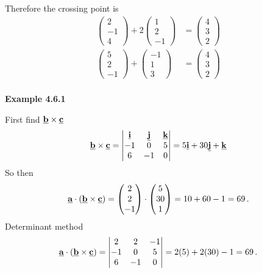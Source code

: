 Therefore the crossing point is
\begin{align*}
\begin{pmatrix} 2 \\ -1 \\ 4 \end{pmatrix} + 2 \begin{pmatrix} 1 \\ 2 \\ -1 \end{pmatrix} &= \begin{pmatrix} 4 \\ 3 \\ 2 \end{pmatrix}\\
\begin{pmatrix} 5 \\ 2 \\ -1 \end{pmatrix} + \begin{pmatrix} -1 \\ 1 \\ 3 \end{pmatrix} &= \begin{pmatrix} 4 \\ 3 \\ 2 \end{pmatrix}\\
\end{align*}

\textbf{Example 4.6.1} \par

First find $\underline{\mathbf{b}}\times\underline{\mathbf{c}}$
\begin{align*}
\underline{\mathbf{b}}\times\underline{\mathbf{c}} = \begin{vmatrix}
    \underline{\mathbf{i}} & \underline{\mathbf{j}} & \underline{\mathbf{k}}\\
    -1 & 0 & 5 \\
    6 & -1 & 0
\end{vmatrix} = 5\underline{\mathbf{i}} + 30\underline{\mathbf{j}} + \underline{\mathbf{k}}\\
\end{align*}
So then
\begin{align*}
\underline{\mathbf{a}} \cdot (\underline{\mathbf{b}}\times\underline{\mathbf{c}}) = \begin{pmatrix}
    2 \\ 2 \\ -1
\end{pmatrix}
\cdot
\begin{pmatrix}
    5 \\ 30 \\ 1
\end{pmatrix} = 10 + 60 - 1 = 69 \,.
\end{align*}
Determinant method
\begin{align*}
\underline{\mathbf{a}} \cdot (\underline{\mathbf{b}}\times\underline{\mathbf{c}}) =  \begin{vmatrix}
    2 & 2 & -1\\
    -1 & 0 & 5 \\
    6 & -1 & 0
\end{vmatrix} = 2(5) + 2(30)  -1 = 69 \, .\\
\end{align*}

